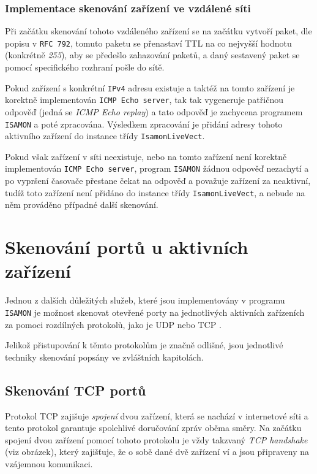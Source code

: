 \subsection{Implementace skenování zařízení ve vzdálené síti}
Při začátku skenování tohoto vzdáleného zařízení se na začátku vytvoří paket, dle popisu v \texttt{RFC 792}\cite{RFC792}, tomuto paketu se přenastaví TTL na co nejvyšší hodnotu (konkrétně \textit{255}), aby se předešlo zahazování paketů, a daný sestavený paket se pomocí specifického rozhraní pošle do sítě. 

Pokud zařízení s konkrétní \texttt{IPv4} adresu existuje a taktéž na tomto zařízení je korektně implementován \texttt{ICMP Echo server}, tak  tak vygeneruje patřičnou odpověď (jedná se \textit{ICMP Echo replay}) a tato odpověď je zachycena programem \texttt{ISAMON} a poté zpracována. Výsledkem zpracování je přidání adresy tohoto aktivního zařízení do instance třídy \texttt{IsamonLiveVect}.

Pokud však zařízení v síti neexistuje, nebo na tomto zařízení není korektně implementován \texttt{ICMP Echo server}, program \texttt{ISAMON} žádnou odpověď nezachytí a po vypršení časovače přestane čekat na odpověď a považuje zařízení za neaktivní, tudíž toto zařízení není přidáno do instance třídy \texttt{IsamonLiveVect}, a nebude na něm prováděno případné další skenování.



\chapter{Skenování portů u aktivních zařízení}
Jednou z dalších důležitých služeb, které jsou implementovány v programu \texttt{ISAMON} je možnost skenovat otevřené porty na jednotlivých aktivních zařízeních za pomoci rozdílných protokolů, jako je UDP \cite{RFC768} nebo TCP \cite{RFC793}.

Jelikož přistupování k těmto protokolům je značně odlišné, jsou jednotlivé techniky skenování popsány ve zvláštních kapitolách.

\section{Skenování TCP portů}
Protokol TCP zajišuje \textit{spojení} dvou zařízení, která se nachází v internetové síti a tento protokol garantuje spolehlivé doručování zpráv oběma směry. Na začátku spojení dvou zařízení pomocí tohoto protokolu je vždy takzvaný \textit{TCP handshake} (viz obrázek), který zajišťuje, že o sobě dané dvě zařízení ví a jsou připraveny na vzájemnou komunikaci. 
\newline

